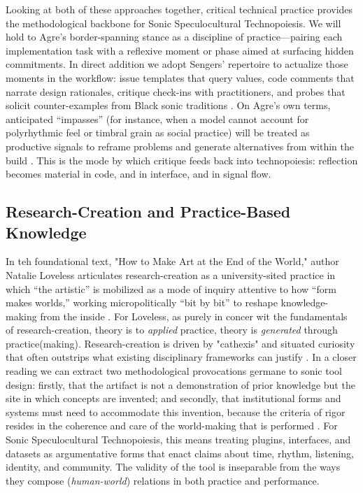 Looking at both of these approaches together, critical technical practice provides the methodological backbone for Sonic Speculocultural Technopoiesis. We will hold to Agre’s border-spanning stance as a discipline of practice—pairing each implementation task with a reflexive moment or phase aimed at surfacing hidden commitments. In direct addition we adopt Sengers’ repertoire to actualize those moments in the workflow: issue templates that query values, code comments that narrate design rationales, critique check-ins with practitioners, and probes that solicit counter-examples from Black sonic traditions \parencite{Agre_1998,Sengers_2005}. On Agre’s own terms, anticipated “impasses” (for instance, when a model cannot account for polyrhythmic feel or timbral grain as social practice) will be treated as productive signals to reframe problems and generate alternatives from within the build \parencite[p.154-155]{Agre_1998}. This is the mode by which critique feeds back into technopoiesis: reflection becomes material in code, and in interface, and in signal flow.

\subsection{Research-Creation and Practice-Based Knowledge}
In teh foundational text, "How to Make Art at the End of the World," author Natalie Loveless articulates research-creation as a university-sited practice in which “the artistic” is mobilized as a mode of inquiry attentive to how “form makes worlds,” working micropolitically “bit by bit” to reshape knowledge-making from the inside \parencite[p.~102]{Loveless_2019}. For Loveless, as purely in concer wit the fundamentals of research-creation, theory is to \emph{applied} practice, theory is \emph{generated} through practice(making). Research-creation is driven by "cathexis" and situated curiosity that often outstrips what existing disciplinary frameworks can justify \parencite[p.~15]{Loveless_2019}. In a closer reading we can extract two methodological provocations germane to sonic tool design: firstly, that the artifact is not a demonstration of prior knowledge but the site in which concepts are invented; and secondly, that institutional forms and systems must need to accommodate this invention, because the criteria of rigor resides in the coherence and care of the world-making that is performed \parencite[p.54-56]{Loveless_2019}. For Sonic Speculocultural Technopoiesis, this means treating plugins, interfaces, and datasets as argumentative forms that enact claims about time, rhythm, listening, identity, and community. The validity of the tool is inseparable from the ways they compose (\emph{human-world}) relations in both practice and performance.

